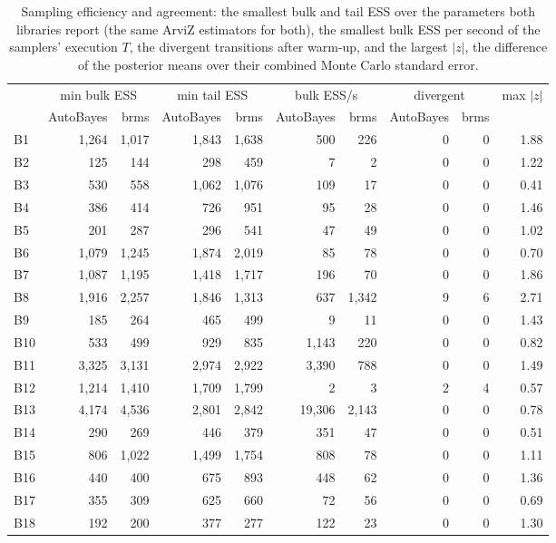 \documentclass[11pt]{article}
\begin{document}
\begin{table}[H]
\small
\setlength{\tabcolsep}{4pt}
\begin{center}
\begin{tabular}{@{}lrrrrrrrrr@{}}
\toprule
& \multicolumn{2}{c}{min bulk ESS} & \multicolumn{2}{c}{min tail ESS} & \multicolumn{2}{c}{bulk ESS/s} & \multicolumn{2}{c}{divergent} & max $|z|$ \\
\cmidrule(lr){2-3}\cmidrule(lr){4-5}\cmidrule(lr){6-7}\cmidrule(lr){8-9}& AutoBayes & brms & AutoBayes & brms & AutoBayes & brms & AutoBayes & brms & \\
\midrule
B1 & 1,264 & 1,017 & 1,843 & 1,638 & 500 & 226 & 0 & 0 & 1.88 \\
B2 & 125 & 144 & 298 & 459 & 7 & 2 & 0 & 0 & 1.22 \\
B3 & 530 & 558 & 1,062 & 1,076 & 109 & 17 & 0 & 0 & 0.41 \\
B4 & 386 & 414 & 726 & 951 & 95 & 28 & 0 & 0 & 1.46 \\
B5 & 201 & 287 & 296 & 541 & 47 & 49 & 0 & 0 & 1.02 \\
B6 & 1,079 & 1,245 & 1,874 & 2,019 & 85 & 78 & 0 & 0 & 0.70 \\
B7 & 1,087 & 1,195 & 1,418 & 1,717 & 196 & 70 & 0 & 0 & 1.86 \\
B8 & 1,916 & 2,257 & 1,846 & 1,313 & 637 & 1,342 & 9 & 6 & 2.71 \\
B9 & 185 & 264 & 465 & 499 & 9 & 11 & 0 & 0 & 1.43 \\
B10 & 533 & 499 & 929 & 835 & 1,143 & 220 & 0 & 0 & 0.82 \\
B11 & 3,325 & 3,131 & 2,974 & 2,922 & 3,390 & 788 & 0 & 0 & 1.49 \\
B12 & 1,214 & 1,410 & 1,709 & 1,799 & 2 & 3 & 2 & 4 & 0.57 \\
B13 & 4,174 & 4,536 & 2,801 & 2,842 & 19,306 & 2,143 & 0 & 0 & 0.78 \\
B14 & 290 & 269 & 446 & 379 & 351 & 47 & 0 & 0 & 0.51 \\
B15 & 806 & 1,022 & 1,499 & 1,754 & 808 & 78 & 0 & 0 & 1.11 \\
B16 & 440 & 400 & 675 & 893 & 448 & 62 & 0 & 0 & 1.36 \\
B17 & 355 & 309 & 625 & 660 & 72 & 56 & 0 & 0 & 0.69 \\
B18 & 192 & 200 & 377 & 277 & 122 & 23 & 0 & 0 & 1.30 \\
\bottomrule
\end{tabular}\end{center}
\caption{\small Sampling efficiency and agreement: the smallest bulk and tail ESS over the parameters both libraries report (the same ArviZ estimators for both), the smallest bulk ESS per second of the samplers' execution $T$, the divergent transitions after warm-up, and the largest $|z|$, the difference of the posterior means over their combined Monte Carlo standard error.}\label{tab:eff}
\end{table}
\end{document}
